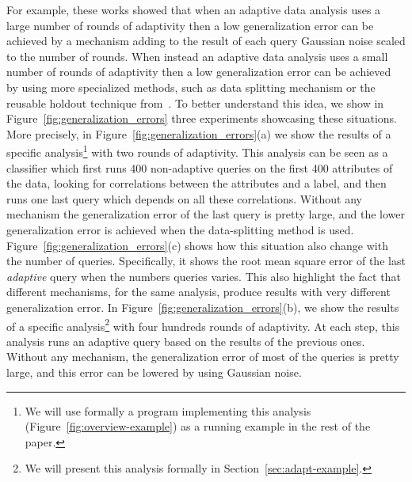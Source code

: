 For example, these works showed that when an adaptive data analysis uses a large number of rounds of adaptivity then a low generalization error can be achieved by a mechanism  
adding to the result of each query Gaussian noise scaled to the number of rounds. When instead  an adaptive data analysis uses a small number of rounds of adaptivity then a low generalization error can be achieved by using more specialized methods, such as data splitting mechanism or the reusable holdout technique from~\cite{DworkFHPRR15}.
To better understand this idea, we show in Figure~\ref{fig:generalization_errors} three experiments showcasing these situations.
More precisely, in Figure~\ref{fig:generalization_errors}(a) we show the results of a specific analysis\footnote{We will use formally a program implementing this analysis (Figure~\ref{fig:overview-example}) as a running example in the rest of the paper.} with two rounds of adaptivity.
This analysis can be seen as a classifier which first runs 400 non-adaptive queries on the first 400 attributes of the data, looking for correlations between the attributes and a label, and then runs one last query which depends on all these correlations.
Without any mechanism the generalization error of the last query is pretty large, and the lower generalization error is achieved when the data-splitting method is used.
Figure~\ref{fig:generalization_errors}(c) shows how this situation also change with the number of queries. Specifically, it shows the root mean square error of the last \emph{adaptive} query when the numbers queries varies. This also highlight the fact that different mechanisms, for the same analysis, produce results with very different generalization error.
In Figure~\ref{fig:generalization_errors}(b), we show the results of a specific analysis\footnote{We will present this analysis formally in Section~\ref{sec:adapt-example}.} with four hundreds rounds of adaptivity.
At each step, this analysis runs an adaptive query based on the results of the previous ones. Without any mechanism, the generalization error of most of the queries is pretty large, and this error can be lowered by using Gaussian noise. 
